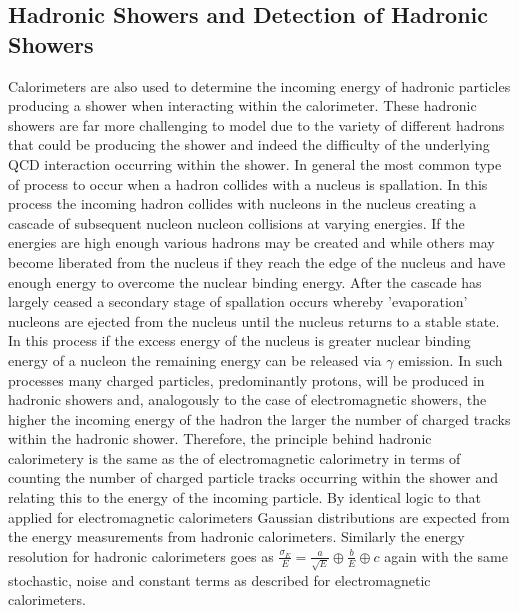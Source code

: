 \subsection{Hadronic Showers and Detection of Hadronic Showers}
Calorimeters are also used to determine the incoming energy of hadronic particles producing a shower when interacting within the calorimeter.  These hadronic showers are far more challenging to model due to the variety of different hadrons that could be producing the shower and indeed the difficulty of the underlying QCD interaction occurring within the shower.  In general the most common type of process to occur when a hadron collides with a nucleus is spallation.  In this process the incoming hadron collides with nucleons in the nucleus creating a cascade of subsequent nucleon nucleon collisions at varying energies.  If the energies are high enough various hadrons may be created and while others may become liberated from the nucleus if they reach the edge of the nucleus and have enough energy to overcome the nuclear binding energy.  After the cascade has largely ceased a secondary stage of spallation occurs whereby 'evaporation' nucleons are ejected from the nucleus until the nucleus returns to a stable state.  In this process if the excess energy of the nucleus is greater nuclear binding energy of a nucleon the remaining energy can be released via $\gamma$ emission.  In such processes many charged particles, predominantly protons, will be produced in hadronic showers and, analogously to the case of electromagnetic showers, the higher the incoming energy of the hadron the larger the number of charged tracks within the hadronic shower.  Therefore, the principle behind hadronic calorimetery is the same as the of electromagnetic calorimetry in terms of counting the number of charged particle tracks occurring within the shower and relating this to the energy of the incoming particle.  By identical logic to that applied for electromagnetic calorimeters Gaussian distributions are expected from the energy measurements from hadronic calorimeters.  Similarly the energy resolution for hadronic calorimeters goes as $\frac{\sigma_{E}}{E} = \frac{a}{\sqrt{E}} \oplus \frac{b}{E} \oplus c$ again with the same stochastic, noise and constant terms as described for electromagnetic calorimeters.

